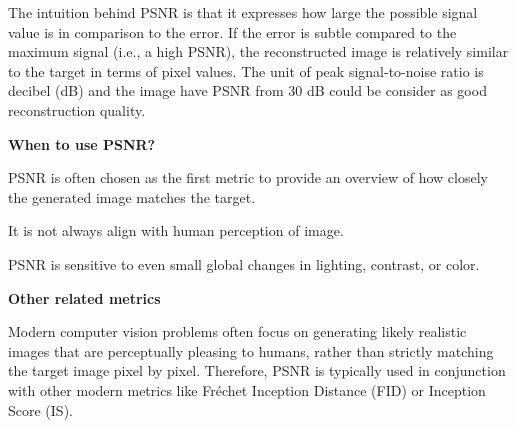 \begin{center}
\end{center}

\vspace{-10pt}

The intuition behind PSNR is that it expresses how large the possible signal value is in comparison to the error. 
If the error is subtle compared to the maximum signal (i.e., a high PSNR), the reconstructed image is relatively similar to the target in terms of pixel values.
The unit of peak signal-to-noise ratio is decibel (dB) and the image have PSNR from 30 dB could be consider as good reconstruction quality.



\textbf{When to use PSNR?}

PSNR is often chosen as the first metric to provide an overview of how closely the generated image matches the target.

{
\item It is not always align with human perception of image.
\item PSNR is sensitive to even small global changes in lighting, contrast, or color.
}


\textbf{Other related metrics}

Modern computer vision problems often focus on generating likely realistic images that are perceptually pleasing to humans, rather than strictly matching the
target image pixel by pixel. Therefore, PSNR is typically used in conjunction with other modern metrics like Fréchet Inception Distance (FID) or Inception Score (IS).


